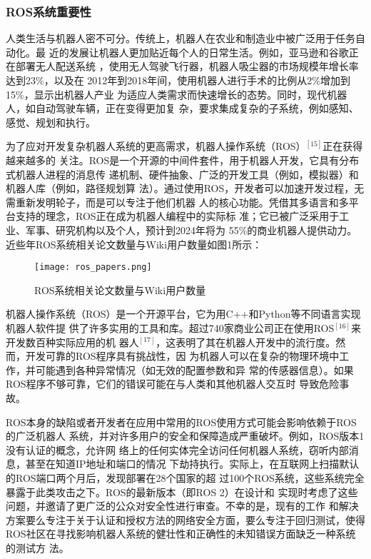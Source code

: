 \subsubsection{ROS系统重要性}
人类生活与机器人密不可分。传统上，机器人在农业和制造业中被广泛用于任务自动化。最
近的发展让机器人更加贴近每个人的日常生活。例如，亚马逊和谷歌正在部署无人配送系统
，使用无人驾驶飞行器，机器人吸尘器的市场规模年增长率达到23\%，以及在
2012年到2018年间，使用机器人进行手术的比例从2\%增加到15\%，显示出机器人产业
为适应人类需求而快速增长的态势。同时，现代机器人，如自动驾驶车辆，正在变得更加复
杂，要求集成复杂的子系统，例如感知、感觉、规划和执行。

为了应对开发复杂机器人系统的更高需求，机器人操作系统（ROS）$^{[15]}$正在获得越来越多的
关注。ROS是一个开源的中间件套件，用于机器人开发，它具有分布式机器人进程的消息传
递机制、硬件抽象、广泛的开发工具（例如，模拟器）和机器人库（例如，路径规划算
法）。通过使用ROS，开发者可以加速开发过程，无需重新发明轮子，而是可以专注于他们机器
人的核心功能。凭借其多语言和多平台支持的理念，ROS正在成为机器人编程中的实际标
准；它已被广泛采用于工业、军事、研究机构以及个人，预计到2024年将为
55\%的商业机器人提供动力。近些年ROS系统相关论文数量与Wiki用户数量如图1所示：

\begin{figure}[H]
  \centering
  \texttt{[image: ros\_papers.png]}
  \caption{ROS系统相关论文数量与Wiki用户数量}
\end{figure}

机器人操作系统（ROS）是一个开源平台，它为用C++和Python等不同语言实现机器人软件提
供了许多实用的工具和库。超过740家商业公司正在使用ROS$^{[16]}$来开发数百种实际应用的机
器人$^{[17]}$，这表明了其在机器人开发中的流行度。然而，开发可靠的ROS程序具有挑战性，因
为机器人可以在复杂的物理环境中工作，并可能遇到各种异常情况（如无效的配置参数和异
常的传感器信息）。如果ROS程序不够可靠，它们的错误可能在与人类和其他机器人交互时
导致危险事故。

ROS本身的缺陷或者开发者在应用中常用的ROS使用方式可能会影响依赖于ROS的广泛机器人
系统，并对许多用户的安全和保障造成严重破坏。例如，ROS版本1没有认证的概念，允许网
络上的任何实体完全访问任何机器人系统，窃听内部消息，甚至在知道IP地址和端口的情况
下劫持执行。实际上，在互联网上扫描默认的ROS端口两个月后，发现部署在28个国家的超
过100个ROS系统，这些系统完全暴露于此类攻击之下。ROS的最新版本（即ROS 2）在设计和
实现时考虑了这些问题，并邀请了更广泛的公众对安全性进行审查。不幸的是，现有的工作
和解决方案要么专注于关于认证和授权方法的网络安全方面，要么专注于回归测试，使得
ROS社区在寻找影响机器人系统的健壮性和正确性的未知错误方面缺乏一种系统的测试方
法。

